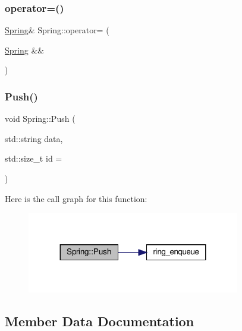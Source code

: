 \mbox{\label{classSpring_a0eae24fff36dcab466577403fb8bd78d}} 
\subsubsection{\texorpdfstring{operator=()}{operator=()}\hspace{0.1cm}{\footnotesize\ttfamily [2/2]}}
{\footnotesize\ttfamily \hyperlink{classSpring}{Spring}\& Spring\+::operator= (\begin{DoxyParamCaption}\item[{\hyperlink{classSpring}{Spring} \&\&}]{ }\end{DoxyParamCaption})\hspace{0.3cm}{\ttfamily [delete]}}

\mbox{\label{classSpring_acd49d999d964fe6f8165163974cd2968}} 
\subsubsection{\texorpdfstring{Push()}{Push()}}
{\footnotesize\ttfamily void Spring\+::\+Push (\begin{DoxyParamCaption}\item[{std\+::string}]{data,  }\item[{std\+::size\+\_\+t}]{id = {} }\end{DoxyParamCaption})}

Here is the call graph for this function\+:\nopagebreak
\begin{figure}[H]
\begin{center}
\leavevmode
\includegraphics[width=263pt]{classSpring_acd49d999d964fe6f8165163974cd2968_cgraph}
\end{center}
\end{figure}


\subsection{Member Data Documentation}
\mbox{\label{classSpring_a9f017cfb37f70e8e9ce9d72efbd9be73}} 
